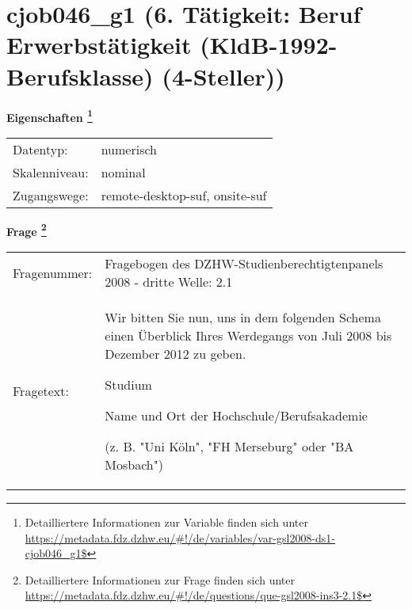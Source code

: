 
    \setcounter{footnote}{0}

    \vspace*{-1.8cm}
	\section{cjob046\_g1 (6. Tätigkeit: Beruf Erwerbstätigkeit (KldB-1992-Berufsklasse) (4-Steller))}
	\label{section:cjob046_g1}



    \vspace*{0.5cm}
    \noindent\textbf{Eigenschaften
	\footnote{Detailliertere Informationen zur Variable finden sich unter
		\url{https://metadata.fdz.dzhw.eu/\#!/de/variables/var-gsl2008-ds1-cjob046_g1$}}}\\
	\begin{tabularx}{\hsize}{@{}lX}
	Datentyp: & numerisch \\
	Skalenniveau: & nominal \\
	Zugangswege: &
	  remote-desktop-suf, 
	  onsite-suf
 \\
    \end{tabularx}



				\vspace*{0.5cm}
                \noindent\textbf{Frage
	                \footnote{Detailliertere Informationen zur Frage finden sich unter
		              \url{https://metadata.fdz.dzhw.eu/\#!/de/questions/que-gsl2008-ins3-2.1$}}}\\
				\begin{tabularx}{\hsize}{@{}lX}
					Fragenummer: &
					  Fragebogen des DZHW-Studienberechtigtenpanels 2008 - dritte Welle:
					  2.1
 \\
					Fragetext: & Wir bitten Sie nun, uns in dem folgenden Schema einen Überblick Ihres Werdegangs von Juli 2008 bis Dezember 2012 zu geben.\par  Studium\par  Name und Ort der Hochschule/Berufsakademie\par  (z. B. "Uni Köln", "FH Merseburg" oder "BA Mosbach") \\
				\end{tabularx}





